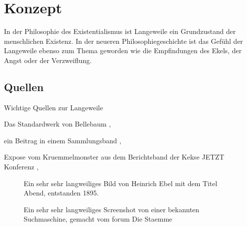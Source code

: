 
\chapter{Konzept}
\label{chapter-konzept}

In der Philosophie des Existentialismus ist Langeweile ein Grundzustand der menschlichen Existenz.
In der neueren Philosophiegeschichte ist das Gefühl der Langeweile ebenso zum Thema geworden wie die Empfindungen des Ekels, der Angst oder der Verzweiflung.


\section{Quellen}

Wichtige Quellen zur Langeweile
\begin{compactitem}
  \item Das Standardwerk von Bellebaum \cite{StandardBelle},
  \item ein Beitrag in einem Sammlungsband \cite{ThGo},
  \item Expose vom Kruemmelmonster aus dem Berichtsband der Kekse JETZT Konferenz \cite{KrMol},
\end{compactitem}










\begin{figure}
  \centering
  \caption[Langweiliges Bild]{Ein sehr sehr langweiliges Bild von Heinrich Ebel mit dem Titel Abend, entstanden 1895.}
  \label{fig-Bild1}
\end{figure}

\begin{figure}
  \centering
  \caption[Langweiliges Screenshot]{Ein sehr sehr langweiliges Screenshot von einer bekannten Suchmaschine, gemacht vom forum Die Staemme}
  \label{fig-Bild2}
\end{figure}










